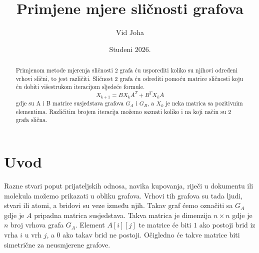 \documentclass[12pt, letterpaper]{article}
\title{Primjene mjere sličnosti grafova}
\author{Vid Joha}
\date{Studeni 2026.}
\numberwithin{figure}{section}
\begin{document}
\maketitle
\begin{abstract}
Primjenom metode mjerenja sličnosti 2 grafa ću usporediti koliko su njihovi određeni vrhovi slični, to jest različiti. Sličnost 2 grafa ću odrediti pomoću matrice sličnosti koju ću dobiti višestrukom iteracijom sljedeće formule.\[X_{k+1} = BX_kA^T + B^TX_kA\] gdje su A i B matrice susjedstava grafova $G_A$ i $G_B$, a $X_k$ je neka matrica sa pozitivnim elementima.
Različitim brojem iteracija možemo saznati koliko i na koji način su 2 grafa slična.
\end{abstract}

\section{Uvod}
Razne stvari poput prijateljskih odnosa, navika kupovanja, riječi u dokumentu ili molekula možemo prikazati u obliku grafova. Vrhovi tih grafova su tada ljudi, stvari ili atomi, a bridovi su veze između njih. Takav graf ćemo označiti sa $G_A$ gdje je $A$ pripadna matrica susjedstava. Takva matrica je dimenzija $n\times{n}$ gdje je $n$ broj vrhova grafa $G_A$. Element $A[i][j]$ te matrice će biti $1$ ako postoji brid iz vrha $i$ u vrh $j$, a $0$ ako takav brid ne postoji. Očigledno će takve matrice biti simetrične za neusmjerene grafove. 
\end{document}
